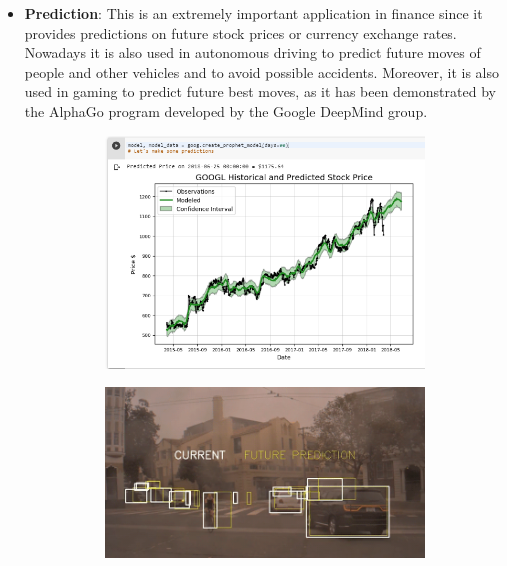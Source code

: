 \begin{itemize}
          \newpage
    \item \textbf{Prediction}: This is an extremely important application in finance since it provides predictions on future stock prices or currency exchange rates. Nowadays it is also used in autonomous driving to predict future moves of people and other vehicles and to avoid possible accidents. Moreover, it is also used in gaming to predict future best moves, as it has been demonstrated by the AlphaGo program developed by the Google DeepMind group.
          \vspace{5mm}

          \begin{figure}[h]
              \centering
              \begin{subfigure}{0.45\textwidth}
                  \centering
                  \includegraphics[width=\textwidth]{../img/Prediction_finance}
              \end{subfigure}
              \hfill
              \begin{subfigure}{0.45\textwidth}
                  \centering
                  \includegraphics[width=\textwidth]{../img/Autonomous_driving}
              \end{subfigure}
          \end{figure}


\end{itemize}
